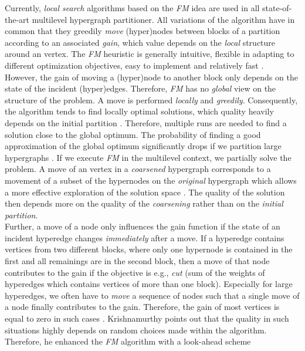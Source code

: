Currently, \emph{local search} algorithms based on the \emph{FM} idea \cite{fiduccia1988linear} 
are used in all state-of-the-art multilevel hypergraph partitioner. All variations
of the algorithm have in common that they greedily \emph{move} (hyper)nodes between
blocks of a partition according to an associated \emph{gain}, which value depends on
the \emph{local} structure around an vertex. The \emph{FM} heuristic is generally
intuitive, flexible in adapting to different optimization objectives, easy to implement and
relatively fast \cite{zhao2002effective}. \\
However, the gain of moving a (hyper)node to another block only depends on the state of the
incident (hyper)edges. Therefore, \emph{FM} has no \emph{global} view on the structure
of the problem. A move is performed \emph{locally} and \emph{greedily}.
Consequently, the algorithm tends to find locally optimal solutions, which quality heavily depends
on the initial partition \cite{dutt1997vlsi}. Therefore, multiple runs are needed to find
a solution close to the global optimum. The probability of finding a good approximation
of the global optimum significantly drops if we partition large hypergraphs \cite{dutt1997vlsi}.
If we execute \emph{FM} in the multilevel context, we partially solve the problem.
A move of an vertex in a \emph{coarsened} hypergraph corresponds to a movement
of a subset of the hypernodes on the \emph{original} hypergraph which allows a more 
effective exploration of the solution space \cite{papa2007hypergraph}. The quality of
the solution then depends more on the quality of the \emph{coarsening} rather than
on the \emph{initial partition}.\\
Further, a move of a node only influences the gain function if the state of an incident hyperedge
changes \emph{immediately} after a move. If a hyperedge contains vertices from two different blocks,
where only one hypernode is contained in the first and all remainings are in the second block,
then a move of that node contributes to the gain if the objective is e.g., \emph{cut} 
(sum of the weights of hyperedges which contains vertices of more than one block). 
Especially for large hyperedges, we often have to \emph{move} a sequence of nodes
such that a single move of a node finally contributes to the gain.
Therefore, the gain of most vertices is equal to zero in such cases \cite{mann2014formula}. 
Krishnamurthy \cite{krishnamurthy1984improved} points out that the quality 
in such situations highly depends on random choices made within
the algorithm. Therefore, he enhanced the \emph{FM} algorithm with a look-ahead scheme
